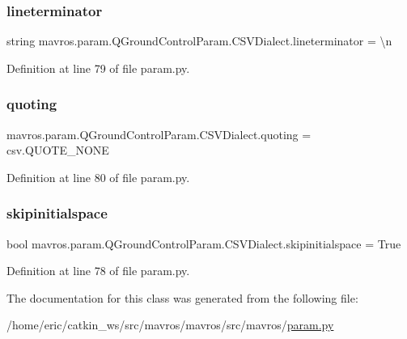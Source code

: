 \subsubsection{\texorpdfstring{lineterminator}{lineterminator}}
{\footnotesize\ttfamily string mavros.\+param.\+Q\+Ground\+Control\+Param.\+C\+S\+V\+Dialect.\+lineterminator = \textquotesingle{}\textbackslash{}n\textquotesingle{}\hspace{0.3cm}{\ttfamily [static]}}



Definition at line 79 of file param.\+py.

\mbox{\label{classmavros_1_1param_1_1QGroundControlParam_1_1CSVDialect_a6e0edbfabd4b52544b05a1cba8383046}} 
\subsubsection{\texorpdfstring{quoting}{quoting}}
{\footnotesize\ttfamily mavros.\+param.\+Q\+Ground\+Control\+Param.\+C\+S\+V\+Dialect.\+quoting = csv.\+Q\+U\+O\+T\+E\+\_\+\+N\+O\+NE\hspace{0.3cm}{\ttfamily [static]}}



Definition at line 80 of file param.\+py.

\mbox{\label{classmavros_1_1param_1_1QGroundControlParam_1_1CSVDialect_a8019db67366707f27db4a9a5030ac24e}} 
\subsubsection{\texorpdfstring{skipinitialspace}{skipinitialspace}}
{\footnotesize\ttfamily bool mavros.\+param.\+Q\+Ground\+Control\+Param.\+C\+S\+V\+Dialect.\+skipinitialspace = True\hspace{0.3cm}{\ttfamily [static]}}



Definition at line 78 of file param.\+py.



The documentation for this class was generated from the following file\+:\begin{DoxyCompactItemize}
\item 
/home/eric/catkin\+\_\+ws/src/mavros/mavros/src/mavros/\mbox{\hyperlink{param_8py}{param.\+py}}\end{DoxyCompactItemize}
